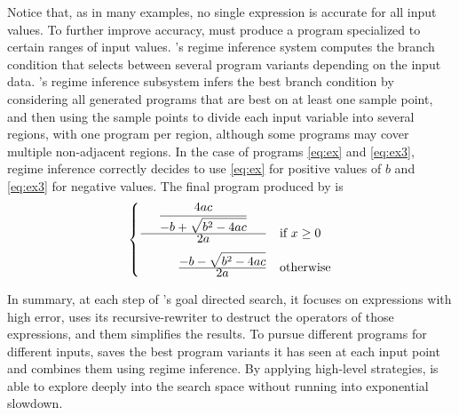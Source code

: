 \documentclass[paper.tex]{subfiles}
\begin{document}
Notice that, as in many examples, no single expression is accurate for
all input values.  To further improve accuracy, \casio must produce a
program specialized to certain ranges of input values.  \casio's
regime inference system computes the branch condition that selects
between several program variants depending on the input data.
\casio's regime inference subsystem infers the best branch condition
by considering all generated programs that are best on at least one
sample point, and then using the sample points to divide each input
variable into several regions, with one program per region, although
some programs may cover multiple non-adjacent regions.  In the case of
programs \eqref{eq:ex} and \eqref{eq:ex3}, regime inference correctly
decides to use \eqref{eq:ex} for positive values of $b$ and
\eqref{eq:ex3} for negative values.  The final program produced by
\casio is
\[
\begin{cases}
  \frac{\displaystyle
    \phantom{\hspace{0.5cm}}
    \frac{4ac}
    {\displaystyle-b + \sqrt{b^2 - 4ac}}
    \phantom{\hspace{0.5cm}}}
  {\displaystyle 2a}
  & \text{if $x \ge 0$} \\[8pt]

  \hfill \frac{\displaystyle -b - \sqrt{b^2 - 4ac}}
    {\displaystyle 2a}
    & \text{otherwise} \\
\end{cases}
\]

In summary, at each step of \casio's goal directed search, it focuses
on expressions with high error, uses its recursive-rewriter to
destruct the operators of those expressions, and them simplifies the
results.  To pursue different programs for different inputs, \casio
saves the best program variants it has seen at each input point and
combines them using regime inference.  By applying high-level
strategies, \casio is able to explore deeply into the search space
without running into exponential slowdown.
\end{document}
